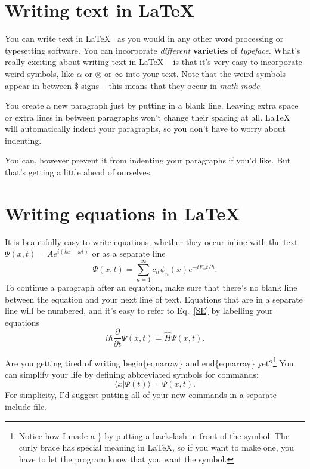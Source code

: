 
\section{Writing text in \LaTeX}
You can write text in \LaTeX ~ as you would in any other word processing or typesetting software.  You can incorporate \textit{different} \textbf{varieties} of \textsl{typeface}.  What's really exciting about writing text in \LaTeX 
~ is that it's very easy to incorporate weird symbols, like $\alpha$ or $\otimes$ or $\infty$ into your text.  Note that the weird symbols appear in between \$ signs -- this means that they occur in \textit{math mode}.

You create a new paragraph just by putting in a blank line.  Leaving extra space or extra lines in between paragraphs won't change their spacing at all.  \LaTeX ~ will automatically indent your paragraphs, so you don't have to worry about indenting.

\noindent You can, however prevent it from indenting your paragraphs if you'd like.  But that's getting a little ahead of ourselves.  

\section{Writing equations in \LaTeX}
It is beautifully easy to write equations, whether they occur inline with the text  $\Psi(x,t) = A e^{i(kx -\omega t)}$ or as a separate line
\begin{equation}
\Psi(x,t) =\sum_{n=1}^\infty c_n \psi_n(x) e^{-i E_n t/\hbar}.
\end{equation}
To continue a paragraph after an equation, make sure that there's no blank line between the equation and your next line of text.
Equations that are in a separate line will be numbered, and it's easy to refer to Eq.~\ref{SE} by labelling your equations  
\begin{equation}
i\hbar\frac{\partial}{\partial t}\Psi(x,t) = \hat{H} \Psi(x,t). 
\label{SE}
\end{equation}

Are you getting tired of writing begin\{eqnarray\} and end\{eqnarray\} yet?\footnote{Notice how I made a \} by putting a backslash in front of the symbol.  The curly brace has special meaning in \LaTeX, so if you want to make one, you have to let the program know that you want the symbol.}  You can simplify your life by defining abbreviated symbols for commands:
\newcommand{\beq}{\begin{equation}}
\newcommand{\eeq}{\end{equation}}
\beq
\langle x |\Psi(t)\rangle = \Psi(x,t).
\eeq
For simplicity, I'd suggest putting all of your new commands in a separate include file.

